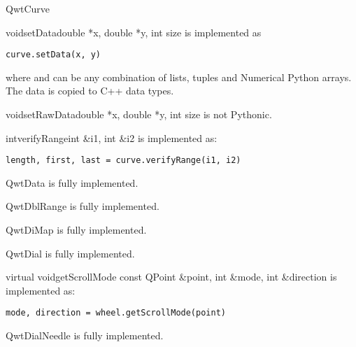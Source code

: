 \documentclass{manual}
\begin{document}
\begin{classdesc*}{QwtCurve}

  \begin{cfuncdesc}{void}{setData}{double *x, double *y, int size}
    is implemented as
    \begin{verbatim}
curve.setData(x, y)
    \end{verbatim}
    where  and  can be any combination of lists, tuples and
    Numerical Python arrays.  The data is copied to C++ data types.
  \end{cfuncdesc}

  \begin{cfuncdesc}{void}{setRawData}{double *x, double *y, int size}
      is not Pythonic.
  \end{cfuncdesc}

  \begin{cfuncdesc}{int}{verifyRange}{int \&i1, int \&i2}
    is implemented as:
    \begin{verbatim}
length, first, last = curve.verifyRange(i1, i2)
    \end{verbatim}
  \end{cfuncdesc}

\end{classdesc*}

\begin{classdesc*}{QwtData}
  is fully implemented.
\end{classdesc*}

\begin{classdesc*}{QwtDblRange}
  is fully implemented.
\end{classdesc*}

\begin{classdesc*}{QwtDiMap}
  is fully implemented.
\end{classdesc*}

\begin{classdesc*}{QwtDial}
  is fully implemented.

  \begin{cfuncdesc}{virtual void}{getScrollMode}{
      const QPoint \&point, int \&mode, int \&direction}
    is implemented as:
    \begin{verbatim}
mode, direction = wheel.getScrollMode(point)
    \end{verbatim}    
  \end{cfuncdesc}

\end{classdesc*}

\begin{classdesc*}{QwtDialNeedle}
  is fully implemented.
\end{classdesc*}
\end{document}
